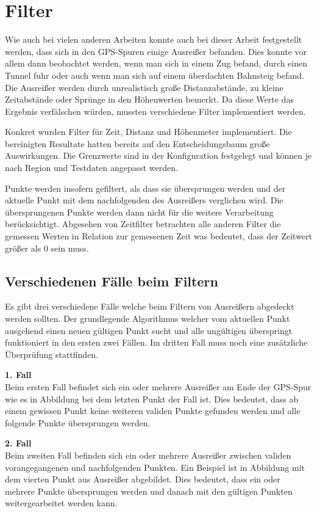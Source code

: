 \chapter{Filter}
Wie auch bei vielen anderen Arbeiten konnte auch bei dieser Arbeit festgestellt werden, dass sich in den GPS-Spuren einige Ausreißer befanden. Dies konnte vor allem dann beobachtet werden, wenn man sich in einem Zug befand, durch einen Tunnel fuhr oder auch wenn man sich auf einem überdachten Bahnsteig befand. Die Ausreißer werden durch unrealistisch große Distanzabstände, zu kleine Zeitabstände oder Sprünge in den Höhenwerten bemerkt. Da diese Werte das Ergebnis verfälschen würden, mussten verschiedene Filter implementiert werden. 

Konkret wurden Filter für Zeit, Distanz und Höhenmeter implementiert. Die bereinigten Resultate hatten bereits auf den Entscheidungsbaum große Auswirkungen. Die Grenzwerte sind in der Konfiguration festgelegt und können je nach Region und Testdaten angepasst werden.

Punkte werden insofern gefiltert, als dass sie übersprungen werden und der aktuelle Punkt mit dem nachfolgenden des Ausreißers verglichen wird. Die übersprungenen Punkte werden dann nicht für die weitere Verarbeitung berücksichtigt. Abgesehen von Zeitfilter betrachten alle anderen Filter die gemessen Werten in Relation zur gemessenen Zeit was bedeutet, dass der Zeitwert größer als 0 sein muss.

\section{Verschiedenen Fälle beim Filtern}
Es gibt drei verschiedene Fälle welche beim Filtern von Ausreißern abgedeckt werden sollten. Der grundlegende Algorithmus welcher vom aktuellen Punkt ausgehend einen neuen gültigen Punkt sucht und alle ungültigen überspringt funktioniert in den ersten zwei Fällen. Im dritten Fall muss noch eine zusätzliche Überprüfung stattfinden.

\textbf{1. Fall}\\
Beim ersten Fall befindet sich ein oder mehrere Ausreißer am Ende der GPS-Spur wie es in Abbildung  bei dem letzten Punkt der Fall ist. Dies bedeutet, dass ab einem gewissen Punkt keine weiteren validen Punkte gefunden werden und alle folgende Punkte übersprungen werden.


\textbf{2. Fall}\\
Beim zweiten Fall befinden sich ein oder mehrere Ausreißer zwischen validen vorangegangenen und nachfolgenden Punkten. Ein Beispiel ist in Abbildung  mit dem vierten Punkt aus Ausreißer abgebildet. Dies bedeutet, dass ein oder mehrere Punkte übersprungen werden und danach mit den gültigen Punkten weitergearbeitet werden kann.

